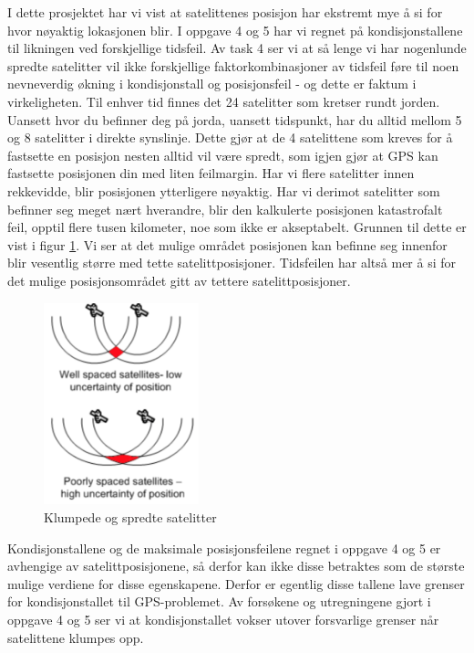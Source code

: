 I dette prosjektet har vi vist at satelittenes posisjon har ekstremt mye å si for hvor nøyaktig lokasjonen blir. I oppgave 4 og 5 har vi regnet på kondisjonstallene til likningen ved forskjellige tidsfeil. Av task 4 ser vi at så lenge vi har nogenlunde spredte satelitter vil ikke forskjellige faktorkombinasjoner av tidsfeil føre til noen nevneverdig økning i kondisjonstall og posisjonsfeil - og dette er faktum i virkeligheten. Til enhver tid finnes det 24 satelitter som kretser rundt jorden. Uansett hvor du befinner deg på jorda, uansett tidspunkt, har du alltid mellom 5 og 8 satelitter i direkte synslinje. Dette gjør at de 4 satelittene som kreves for å fastsette en posisjon nesten alltid vil være spredt, som igjen gjør at GPS kan fastsette posisjonen din med liten feilmargin. Har vi flere satelitter innen rekkevidde, blir posisjonen ytterligere nøyaktig. Har vi derimot satelitter som befinner seg meget nært hverandre, blir den kalkulerte posisjonen katastrofalt feil, opptil flere tusen kilometer, noe som ikke er akseptabelt. Grunnen til dette er vist i figur \ref{fig:bunchedsat}. Vi ser at det mulige området posisjonen kan befinne seg innenfor blir vesentlig større med tette satelittposisjoner. Tidsfeilen har altså mer å si for det mulige posisjonsområdet gitt av tettere satelittposisjoner.

\begin{figure}[htbp]
	\centering
	\includegraphics[width=0.4\textwidth]{sections/Conclusion/bunchedsat.png}
	\caption{Klumpede og spredte satelitter}
	\label{fig:bunchedsat}
\end{figure}

Kondisjonstallene og de maksimale posisjonsfeilene regnet i oppgave 4 og 5 er avhengige av satelittposisjonene, så derfor kan ikke disse betraktes som de største mulige verdiene for disse egenskapene. Derfor er egentlig disse tallene lave grenser for kondisjonstallet til GPS-problemet. Av forsøkene og utregningene gjort i oppgave 4 og 5 ser vi at kondisjonstallet vokser utover forsvarlige grenser når satelittene klumpes opp. 

